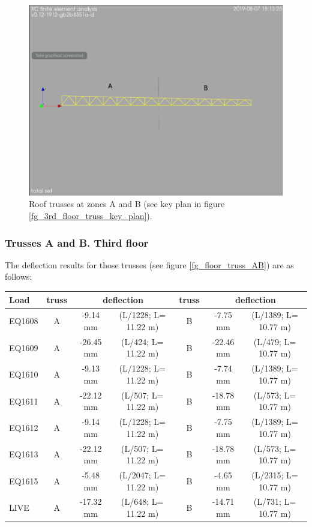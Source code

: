 \begin{figure}
  \begin{center}
  \includegraphics[width=120mm]{figures/roof_truss_AB}
  \end{center}
  \caption{Roof trusses at zones A and B (see key plan in figure \ref{fg_3rd_floor_truss_key_plan}).}\label{fg_roof_truss_AB}
\end{figure}

\subsubsection{Trusses A and B. Third floor}
The deflection results for those trusses (see figure \ref{fg_floor_truss_AB}) are as follows:

\begin{center}
  \begin{scriptsize}
  \begin{tabular}{|l|c|c|c|c|c|c|}
    \hline
    \textbf{Load} & \textbf{truss} & \multicolumn{2}{c|}{\textbf{deflection}} & \textbf{truss} & \multicolumn{2}{c|}{\textbf{deflection}} \\
    \hline
EQ1608 & A & -9.14 mm & (L/1228; L= 11.22 m)  & B & -7.75 mm & (L/1389; L= 10.77 m) \\
EQ1609 & A & -26.45 mm & (L/424; L= 11.22 m) & B & -22.46 mm & (L/479; L= 10.77 m) \\
EQ1610 & A & -9.13 mm & (L/1228; L= 11.22 m) & B & -7.74 mm & (L/1389; L= 10.77 m) \\
EQ1611 & A & -22.12 mm & (L/507; L= 11.22 m) & B & -18.78 mm & (L/573; L= 10.77 m) \\
EQ1612 & A & -9.14 mm & (L/1228; L= 11.22 m) & B & -7.75 mm & (L/1389; L= 10.77 m) \\
EQ1613 & A & -22.12 mm & (L/507; L= 11.22 m) & B & -18.78 mm & (L/573; L= 10.77 m) \\
EQ1615 & A & -5.48 mm & (L/2047; L= 11.22 m) & B & -4.65 mm & (L/2315; L= 10.77 m) \\
LIVE & A & -17.32 mm & (L/648; L= 11.22 m) & B & -14.71 mm & (L/731; L= 10.77 m) \\
\hline
  \end{tabular}
  \end{scriptsize}
\end{center}

